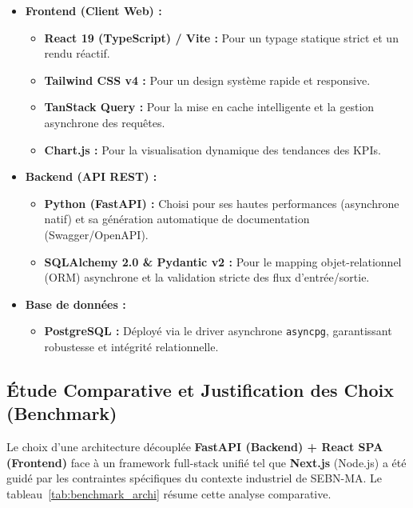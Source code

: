 \begin{itemize}
    \item \textbf{Frontend (Client Web) :} 
    \begin{itemize}
        \item \textbf{React 19 (TypeScript) / Vite :} Pour un typage statique strict et un rendu réactif.
        \item \textbf{Tailwind CSS v4 :} Pour un design système rapide et responsive.
        \item \textbf{TanStack Query :} Pour la mise en cache intelligente et la gestion asynchrone des requêtes.
        \item \textbf{Chart.js :} Pour la visualisation dynamique des tendances des KPIs.
    \end{itemize}
    
    \item \textbf{Backend (API REST) :}
    \begin{itemize}
        \item \textbf{Python (FastAPI) :} Choisi pour ses hautes performances (asynchrone natif) et sa génération automatique de documentation (Swagger/OpenAPI).
        \item \textbf{SQLAlchemy 2.0 \& Pydantic v2 :} Pour le mapping objet-relationnel (ORM) asynchrone et la validation stricte des flux d'entrée/sortie.
    \end{itemize}
    
    \item \textbf{Base de données :} 
    \begin{itemize}
        \item \textbf{PostgreSQL :} Déployé via le driver asynchrone \texttt{asyncpg}, garantissant robustesse et intégrité relationnelle.
    \end{itemize}
\end{itemize}

\subsection{Étude Comparative et Justification des Choix (Benchmark)}
Le choix d'une architecture découplée \textbf{FastAPI (Backend) + React SPA (Frontend)} face à un framework full-stack unifié tel que \textbf{Next.js} (Node.js) a été guidé par les contraintes spécifiques du contexte industriel de SEBN-MA. Le tableau~\ref{tab:benchmark_archi} résume cette analyse comparative.

